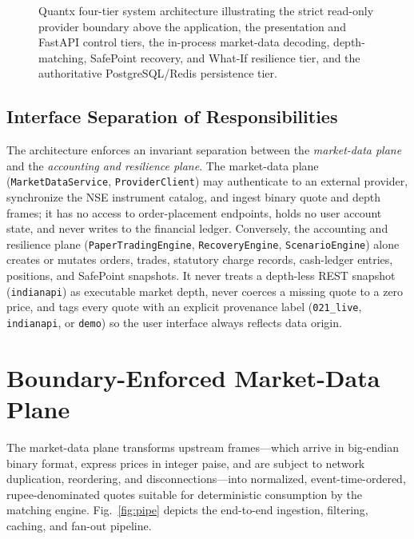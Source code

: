 \documentclass[journal,onecolumn,10pt]{IEEEtran}
\begin{document}
\begin{figure}[!t]
{}
\caption{Quantx four-tier system architecture illustrating the strict read-only provider boundary above the application, the presentation and FastAPI control tiers, the in-process market-data decoding, depth-matching, SafePoint recovery, and What-If resilience tier, and the authoritative PostgreSQL/Redis persistence tier.}
\label{fig:arch}
\end{figure}

\subsection{Interface Separation of Responsibilities}
The architecture enforces an invariant separation between the \emph{market-data plane} and the \emph{accounting and resilience plane}. The market-data plane (\texttt{MarketDataService}, \texttt{ProviderClient}) may authenticate to an external provider, synchronize the NSE instrument catalog, and ingest binary quote and depth frames; it has no access to order-placement endpoints, holds no user account state, and never writes to the financial ledger. Conversely, the accounting and resilience plane (\texttt{PaperTradingEngine}, \texttt{RecoveryEngine}, \texttt{ScenarioEngine}) alone creates or mutates orders, trades, statutory charge records, cash-ledger entries, positions, and SafePoint snapshots. It never treats a depth-less REST snapshot (\texttt{indianapi}) as executable market depth, never coerces a missing quote to a zero price, and tags every quote with an explicit provenance label (\texttt{021\_live}, \texttt{indianapi}, or \texttt{demo}) so the user interface always reflects data origin.

\section{Boundary-Enforced Market-Data Plane}

The market-data plane transforms upstream frames—which arrive in big-endian binary format, express prices in integer paise, and are subject to network duplication, reordering, and disconnections—into normalized, event-time-ordered, rupee-denominated quotes suitable for deterministic consumption by the matching engine. Fig.~\ref{fig:pipe} depicts the end-to-end ingestion, filtering, caching, and fan-out pipeline.
\end{document}
